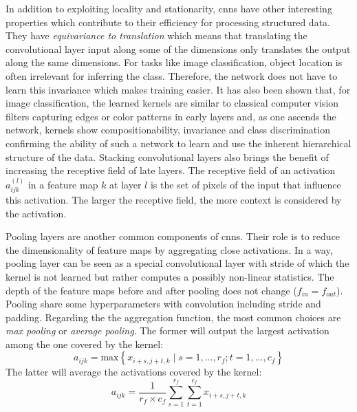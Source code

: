 In addition to exploiting locality and stationarity, \acrshort{cnn}s have other interesting properties which contribute to their efficiency for processing structured data. They have \textit{equivariance to translation} which means that translating the convolutional layer input along some of the dimensions only translates the output along the same dimensions. For tasks like image classification, object location is often irrelevant for inferring the class. Therefore, the network does not have to learn this invariance which makes training easier. It has also been shown that, for image classification, the learned kernels are similar to classical computer vision filters capturing edges or color patterns in early layers and, as one ascends the network, kernels show compositionability, invariance and class discrimination \parencite{zeiler2014visualizing} confirming the ability of such a network to learn and use the inherent hierarchical structure of the data. Stacking convolutional layers also brings the benefit of increasing the receptive field of late layers. The receptive field of an activation $a^{(l)}_{ijk}$ in a feature map $k$ at layer $l$ is the set of pixels of the input that influence this activation. The larger the receptive field, the more context is considered by the activation. 

Pooling layers are another common components of \acrshort{cnn}s. Their role is to reduce the dimensionality of feature maps by aggregating close activations. In a way, pooling layer can be seen as a special convolutional layer with stride of which the kernel is not learned but rather computes a possibly non-linear statistics. The depth of the feature maps before and after pooling does not change (\ie $f_{in} = f_{out}$). Pooling share some hyperparameters with convolution including stride and padding. Regarding the the aggregation function, the most common choices are \textit{max pooling} or \textit{average pooling}. The former will output the largest activation among the one covered by the kernel:
\begin{equation}
\label{eqn:backml:maxpooling}
a_{ijk} = \text{max} \left\{ x_{i+s,j+t,k} \mid s = 1, ..., r_f; t = 1, ..., c_f \right\}
\end{equation} 
The latter will average the activations covered by the kernel:
\begin{equation}
\label{eqn:backml:avgpooling}
a_{ijk} = \frac{1}{r_f \times c_f} \sum_{s=1}^{r_f} \sum_{t=1}^{c_f}  x_{i+s,j+t,k} 
\end{equation} 

